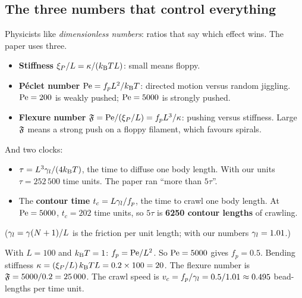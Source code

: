 \documentclass[11pt]{article}
\begin{document}
\subsection{The three numbers that control everything}
Physicists like \emph{dimensionless numbers}: ratios that say which effect wins. The paper uses three.
\begin{itemize}
\item \textbf{Stiffness} $\xi_{P}/L=\kappa/(k_{\mathrm{B}}T L)$: small means floppy.
\item \textbf{Péclet number} $\mathrm{Pe}=f_pL^2/k_{\mathrm{B}}T$: directed motion versus random jiggling. $\mathrm{Pe}=200$ is weakly pushed; $\mathrm{Pe}=5000$ is strongly pushed.
\item \textbf{Flexure number} $\mathfrak{F}=\mathrm{Pe}/(\xi_{P}/L)=f_pL^3/\kappa$: pushing versus stiffness. Large $\mathfrak{F}$ means a strong push on a floppy filament, which favours spirals.
\end{itemize}
And two clocks:
\begin{itemize}
\item $\tau=L^3\gamma_{l}/(4k_{\mathrm{B}}T)$, the time to diffuse one body length. With our units $\tau=252\,500$ time units. The paper ran ``more than $5\tau$''.
\item The \textbf{contour time} $t_c=L\gamma_{l}/f_p$, the time to crawl one body length. At $\mathrm{Pe}=5000$, $t_c=202$ time units, so $5\tau$ is \textbf{6250 contour lengths} of crawling.
\end{itemize}
($\gamma_{l}=\gamma(N+1)/L$ is the friction per unit length; with our numbers $\gamma_{l}=1.01$.)

\begin{notebox}[title=Worked example: from Pe to forces]
With $L=100$ and $k_{\mathrm{B}}T=1$: $f_p=\mathrm{Pe}/L^2$. So $\mathrm{Pe}=5000$ gives $f_p=0.5$. Bending stiffness $\kappa=(\xi_{P}/L)\,k_{\mathrm{B}}T L=0.2\times100=20$. The flexure number is $\mathfrak{F}=5000/0.2=25\,000$.
The crawl speed is $v_c=f_p/\gamma_{l}=0.5/1.01\approx0.495$ bead-lengths per time unit.
\end{notebox}
\end{document}
